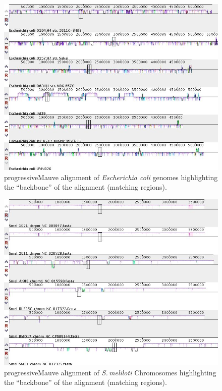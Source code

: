 \documentclass[12pt]{article}
\newcommand{\smel}{\textit{S.\,meliloti}\xspace}
\newcommand{\p}{progressiveMauve\xspace}
\newcommand{\ecoli}{\textit{Escherichia coli}\xspace}
\begin{document}
\begin{figure}
	\includegraphics[width=0.9\linewidth]{./ecoli_Mauve_alignment_pic_26Mar20.jpg}
	\caption{\label{fig:ecoli_mauve}\p alignment of \ecoli genomes highlighting the ``backbone'' of the alignment (matching regions).}
\end{figure}

\begin{figure}
	\includegraphics[width=0.9\linewidth]{./sinoC_Mauve_alignment_pic_26Mar20.jpg}
	\caption{\label{fig:sinoC_mauve}\p alignment of \smel Chromosomes highlighting the ``backbone'' of the alignment (matching regions).}
\end{figure}
\end{document}
